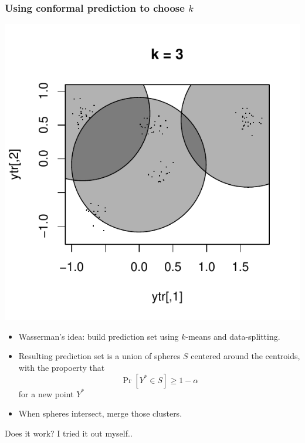 \documentclass{beamer}
\begin{document}
\begin{frame}
\frametitle{Using conformal prediction to choose $k$}
\begin{center}
\includegraphics[scale = 0.3, clip = true, trim = 0.3in 0.4in 0.3in 0.2in]{../conformal_kmeans/k3.pdf}
\end{center}
\begin{itemize}
\item Wasserman's idea: build prediction set using $k$-means and data-splitting. \pause
\item Resulting prediction set is a union of spheres $S$ centered around the centroids, with the propoerty that
\[
\Pr[Y^* \in S] \geq 1 -\alpha
\]
for a new point $Y^*$ \pause
\item When spheres intersect, merge those clusters.\pause
\end{itemize}
Does it work?  I tried it out myself..
\end{frame}
\end{document}
